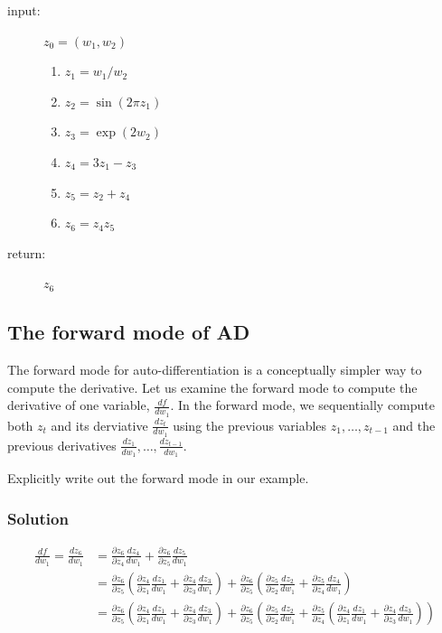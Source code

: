 \documentclass[letterpaper,11pt]{article}
\begin{document}
\begin{description}
\item[input:] $z_0 = \left(w_1,w_2\right)$
  \begin{enumerate}
  \item $z_1 = w_1/w_2$
  \item $z_2 = \sin\left(2\pi z_1\right)$
  \item $z_3 = \exp\left(2w_2\right)$
  \item $z_4 = 3z_1 - z_3$
  \item $z_5 = z_2 + z_4$
  \item $z_6 = z_4z_5$
  \end{enumerate}
\item[return:] $z_6$
\end{description}

\subsection*{The forward mode of AD}

The forward mode for auto-differentiation is a conceptually simpler way to compute the derivative. Let us examine the forward mode to compute the derivative of one variable, $\frac{df}{dw_1}$. In the forward mode, we sequentially compute both $z_t$ and its derviative $\frac{dz_t}{dw_1}$ using the previous variables $z_1,\ldots,z_{t-1}$ and the previous derivatives $\frac{dz_1}{dw_1},\ldots,\frac{dz_{t-1}}{dw_1}$.

Explicitly write out the forward mode in our example.

\subsubsection*{Solution}

\begin{align*}
  \frac{df}{dw_1} = \frac{dz_6}{dw_1}
  &= \frac{\partial z_6}{\partial z_4}\frac{dz_4}{dw_1} +
    \frac{\partial z_6}{\partial z_5}\frac{dz_5}{dw_1} \\
  &= \frac{\partial z_6}{\partial z_5}\left(
    \frac{\partial{z_4}}{\partial{z_1}}\frac{dz_1}{dw_1} +
    \frac{\partial{z_4}}{\partial{z_3}}\frac{dz_3}{dw_1}
    \right) +
    \frac{\partial z_6}{\partial z_5}\left(
    \frac{\partial{z_5}}{\partial{z_2}}\frac{dz_2}{dw_1} +
    \frac{\partial{z_5}}{\partial{z_4}}\frac{dz_4}{dw_1}
    \right) \\
  &= \frac{\partial z_6}{\partial z_5}\left(
    \frac{\partial{z_4}}{\partial{z_1}}\frac{dz_1}{dw_1} +
    \frac{\partial{z_4}}{\partial{z_3}}\frac{dz_3}{dw_1}
    \right) +
    \frac{\partial z_6}{\partial z_5}\left(
    \frac{\partial{z_5}}{\partial{z_2}}\frac{dz_2}{dw_1} +
    \frac{\partial{z_5}}{\partial{z_4}}\left(
    \frac{\partial{z_4}}{\partial{z_1}}\frac{dz_1}{dw_1} +
    \frac{\partial{z_4}}{\partial{z_3}}\frac{dz_3}{dw_1}
    \right)
    \right)
\end{align*}
\end{document}

